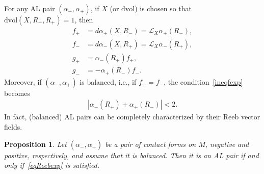 \documentclass[letterpaper, 11pt]{article}
\numberwithin{equation}{section}
\newtheorem{prop}[thm]{Proposition}
\begin{document}
For any AL pair $(\alpha_-, \alpha_+)$, if $X$ (or $\mathrm{dvol}$) is chosen so that $\mathrm{dvol}(X,R_-,R_+) = 1$, then
\begin{align*}
f_+ &= d\alpha_+(X, R_-) = \mathcal{L}_X \alpha_+ (R_-), \\
f_- &= d\alpha_-(X, R_+) = \mathcal{L}_X \alpha_- (R_+),\\
g_+ &= \alpha_-(R_+) f_+, \\
g_- &= - \alpha_+(R_-) f_-.
\end{align*}
Moreover, if $(\alpha_-, \alpha_+)$ is balanced, i.e., if $f_+ = f_-$, the condition~\eqref{ineqfexp} becomes
\begin{align} \label{eqReebexp}
|\alpha_-(R_+) + \alpha_+(R_-)| < 2.
\end{align}
In fact, (balanced) AL pairs can be completely characterized by their Reeb vector fields.

\begin{prop} \label{prop:reebvf}
Let $(\alpha_-, \alpha_+)$ be a pair of contact forms on $M$, negative and positive, respectively, and assume that it is balanced. Then it is an AL pair if and only if~\eqref{eqReebexp} is satisfied.
\end{prop}
\end{document}

